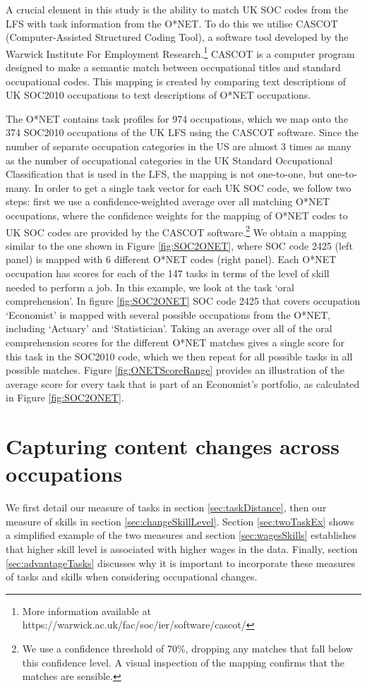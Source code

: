 \documentclass[11pt, oneside]{article}
\begin{document}
	
A crucial element in this study is the ability to match UK SOC codes from the LFS with task information from the O*NET. To do this we utilise CASCOT (Computer-Assisted Structured Coding Tool), a software tool developed by the Warwick Institute For Employment Research.\footnote{More information available at https://warwick.ac.uk/fac/soc/ier/software/cascot/} CASCOT is a computer program designed to make a semantic match between occupational titles and standard occupational codes. This mapping is created by comparing text descriptions of UK SOC2010 occupations to text descriptions of O*NET occupations.
	
	The O*NET contains task profiles for 974 occupations, which we map onto the 374 SOC2010 occupations of the UK LFS using the CASCOT software. Since the number of separate occupation categories in the US are almost 3 times as many as the number of occupational categories in the UK Standard Occupational Classification that is used in the LFS, the mapping is not one-to-one, but one-to-many. In order to get a single task vector for each UK SOC code, we follow two steps: first we use a confidence-weighted average over all matching O*NET occupations, where the confidence weights for the mapping of O*NET codes to UK SOC codes are provided by the CASCOT software.\footnote{We use a confidence threshold of 70\%, dropping any matches that fall below this confidence level. A visual inspection of the mapping confirms that the matches are sensible.} We obtain a mapping similar to the one shown in Figure \ref{fig:SOC2ONET}, where SOC code 2425 (left panel) is mapped with 6 different O*NET codes (right panel). Each O*NET occupation has scores for each of the 147 tasks in terms of the level of skill needed to perform a job. In this example, we look at the task `oral comprehension'. In figure \ref{fig:SOC2ONET} SOC code 2425 that covers occupation `Economist' is mapped with several possible occupations from the O*NET, including `Actuary' and `Statistician'. Taking an average over all of the oral comprehension scores for the different O*NET matches gives a single score for this task in the SOC2010 code, which we then repeat for all possible tasks in all possible matches. Figure \ref{fig:ONETScoreRange} provides an illustration of the average score for every task that is part of an Economist's portfolio, as calculated in Figure \ref{fig:SOC2ONET}.
	
	

	
	\section{Capturing content changes across occupations}
	\label{sec:measures}
	We first detail our measure of tasks in section \ref{sec:taskDistance}, then our measure of skills in section \ref{sec:changeSkillLevel}. Section \ref{sec:twoTaskEx} shows a simplified example of the two measures and section \ref{sec:wagesSkills} establishes that higher skill level is associated with higher wages in the data. Finally, section \ref{sec:advantageTasks} discusses why it is important to incorporate these measures of tasks and skills when considering occupational changes.
\end{document}
